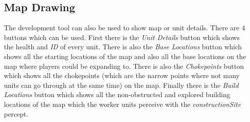 \subsection{Map Drawing}
The development tool can also be used to show map or unit details. There are 4 buttons which can be used. First there is the \textit{Unit Details} button which shows the health and \textit{ID} of every unit. There is also the \textit{Base Locations} button which shows all the starting locations of the map and also all the base locations on the map where players could be expanding to. There is also the \textit{Chokepoints} button which shows all the chokepoints (which are the narrow points where not many units can go through at the same time) on the map. Finally there is the \textit{Build Locations} button which shows all the non-obstructed and explored building locations of the map which the worker units perceive with the \textit{constructionSite} percept.